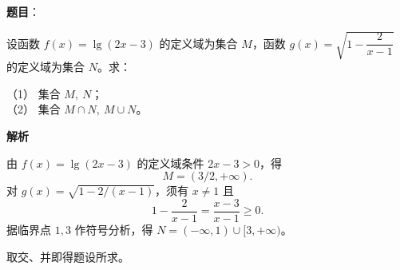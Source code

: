 \begin{answer}

\textbf{题目}：

设函数 $f(x)=\lg(2x-3)$ 的定义域为集合 $M$，函数 $g(x)=\sqrt{1-\dfrac2{x-1}}$ 的定义域为集合 $N$。求：

（1） 集合 $M,\ N$；\\
（2） 集合 $M\cap N,\ M\cup N$。

\textbf{解析}


由 $f(x)=\lg(2x-3)$ 的定义域条件 $2x-3>0$，得
\nopagebreak[4]
\[M=(3/2,+\infty).\]
对 $g(x)=\sqrt{1-2/(x-1)}$，须有 $x\ne1$ 且
\nopagebreak[4]
\[1-\frac2{x-1}=\frac{x-3}{x-1}\ge0.\]
据临界点 $1,3$ 作符号分析，得 $N=(-\infty,1)\cup[3,+\infty)$。


取交、并即得题设所求。

\gkanswer{答案（1）：$M=(3/2,+\infty)$，$N=(-\infty,1)\cup[3,+\infty)$}

\gkanswer{答案（2）：$M\cap N=[3,+\infty)$，$M\cup N=(-\infty,1)\cup(3/2,+\infty)$}

\end{answer}
